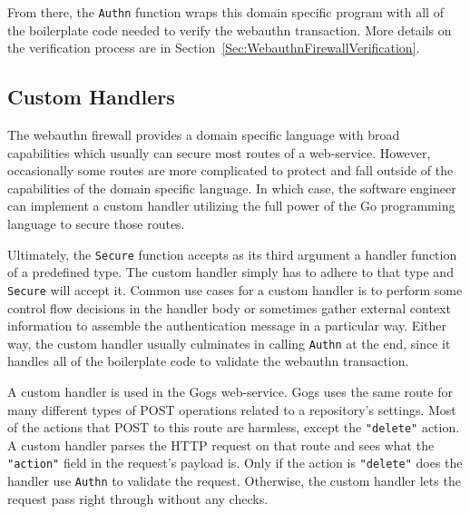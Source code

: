 From there, the \lstinline{Authn} function wraps this domain specific program with all of the boilerplate code needed to verify the webauthn transaction. More details on the verification process are in Section~\ref{Sec:WebauthnFirewallVerification}.




\subsection{Custom Handlers}\label{Sec:CustomHandlers}

The webauthn firewall provides a domain specific language with broad capabilities which usually can secure most routes of a web-service. However, occasionally some routes are more complicated to protect and fall outside of the capabilities of the domain specific language. In which case, the software engineer can implement a custom handler utilizing the full power of the Go programming language to secure those routes.

Ultimately, the \lstinline{Secure} function accepts as its third argument a handler function of a predefined type. The custom handler simply has to adhere to that type and \lstinline{Secure} will accept it. Common use cases for a custom handler is to perform some control flow decisions in the handler body or sometimes gather external context information to assemble the authentication message in a particular way. Either way, the custom handler usually culminates in calling \lstinline{Authn} at the end, since it handles all of the boilerplate code to validate the webauthn transaction.

A custom handler is used in the Gogs web-service. Gogs uses the same route for many different types of POST operations related to a repository's settings. Most of the actions that POST to this route are harmless, except the \lstinline{"delete"} action. A custom handler parses the HTTP request on that route and sees what the \lstinline{"action"} field in the request's payload is. Only if the action is \lstinline{"delete"} does the handler use \lstinline{Authn} to validate the request. Otherwise, the custom handler lets the request pass right through without any checks.


